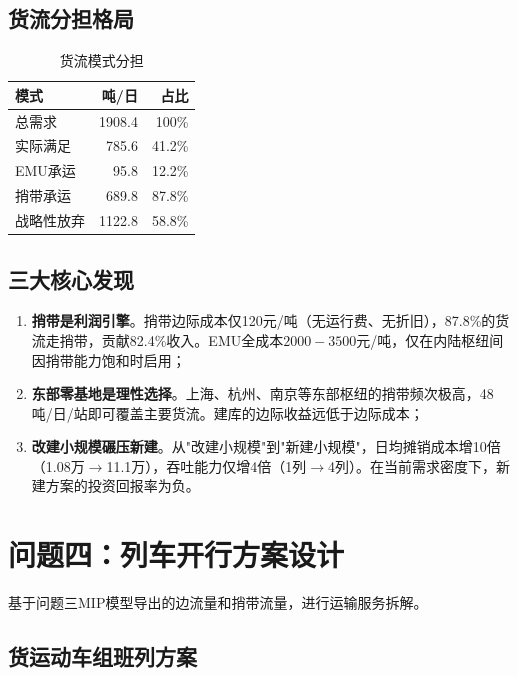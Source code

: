 \documentclass[12pt,a4paper,fontset=none]{ctexart}
\begin{document}
\subsection{货流分担格局}

\begin{table}[H]\centering\small
\caption{货流模式分担}\label{tab:flow}
\begin{tabular}{lrr}
\toprule
模式 & 吨/日 & 占比 \\
\midrule
总需求 & 1908.4 & 100\% \\
实际满足 & 785.6 & 41.2\% \\
\quad EMU承运 & 95.8 & 12.2\% \\
\quad 捎带承运 & 689.8 & 87.8\% \\
战略性放弃 & 1122.8 & 58.8\% \\
\bottomrule
\end{tabular}
\end{table}

\subsection{三大核心发现}

\begin{enumerate}
\item \textbf{捎带是利润引擎}。捎带边际成本仅120元/吨（无运行费、无折旧），87.8\%的货流走捎带，贡献82.4\%收入。EMU全成本$2000-3500$元/吨，仅在内陆枢纽间因捎带能力饱和时启用；
\item \textbf{东部零基地是理性选择}。上海、杭州、南京等东部枢纽的捎带频次极高，48吨/日/站即可覆盖主要货流。建库的边际收益远低于边际成本；
\item \textbf{改建小规模碾压新建}。从"改建小规模"到"新建小规模"，日均摊销成本增10倍（1.08万$\to$11.1万），吞吐能力仅增4倍（1列$\to$4列）。在当前需求密度下，新建方案的投资回报率为负。
\end{enumerate}

\clearpage

\section{问题四：列车开行方案设计}

基于问题三MIP模型导出的边流量和捎带流量，进行运输服务拆解。

\subsection{货运动车组班列方案}
\end{document}
